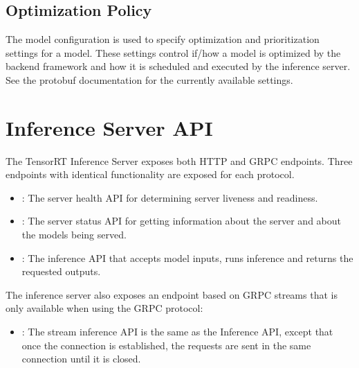 \documentclass[letterpaper,10pt,english]{sphinxmanual}
\begin{document}
\section{Optimization Policy}
\label{\detokenize{model_configuration:optimization-policy}}\label{\detokenize{model_configuration:section-optimization-policy}}
The model configuration  is used to specify
optimization and prioritization settings for a model. These settings
control if/how a model is optimized by the backend framework and how
it is scheduled and executed by the inference server. See the protobuf
documentation for the currently available settings.


\chapter{Inference Server API}
\label{\detokenize{http_grpc_api:inference-server-api}}\label{\detokenize{http_grpc_api:section-inference-server-api}}\label{\detokenize{http_grpc_api::doc}}
The TensorRT Inference Server exposes both HTTP and GRPC
endpoints. Three endpoints with identical functionality are exposed
for each protocol.
\begin{itemize}
\item {} 
{\hyperref[\detokenize{http_grpc_api:section-api-health}]{}}: The server health API for determining
server liveness and readiness.

\item {} 
{\hyperref[\detokenize{http_grpc_api:section-api-status}]{}}: The server status API for getting
information about the server and about the models being served.

\item {} 
{\hyperref[\detokenize{http_grpc_api:section-api-inference}]{}}: The inference API that accepts model
inputs, runs inference and returns the requested outputs.

\end{itemize}

The inference server also exposes an endpoint based on GRPC streams that is
only available when using the GRPC protocol:
\begin{itemize}
\item {} 
{\hyperref[\detokenize{http_grpc_api:section-api-stream-inference}]{}}: The stream inference API is the same
as the Inference API, except that once the connection is established,
the requests are sent in the same connection until it is closed.

\end{itemize}
\end{document}
